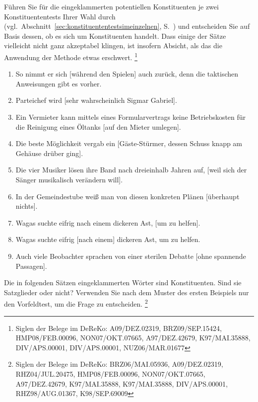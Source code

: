 



\Uebungen

\Uebung \label{u101} Führen Sie für die eingeklammerten potentiellen Konstituenten je zwei Konstituententests Ihrer Wahl durch (vgl.\ Abschnitt~\ref{sec:konstituententestsimeinzelnen}, S.~\pageref{sec:konstituententestsimeinzelnen}) und entscheiden Sie auf Basis dessen, ob es sich um Konstituenten handelt.
Dass einige der Sätze vielleicht nicht ganz akzeptabel klingen, ist insofern Absicht, als das die Anwendung der Methode etwas erschwert.%
\footnote{Siglen der Belege im DeReKo: A09\slash DEZ.02319, BRZ09\slash SEP.15424, HMP08\slash FEB.00096, NON07\slash OKT.07665, A97\slash DEZ.42679, K97\slash MAI.35888, DIV\slash APS.00001, DIV\slash APS.00001, NUZ06\slash MAR.01677}

\begin{enumerate}\Lf
  \item So nimmt er sich [während den Spielen] auch zurück, denn die taktischen Anweisungen gibt es vorher.
  \item Parteichef wird [sehr wahrscheinlich Sigmar Gabriel].
  \item Ein Vermieter kann mittels eines Formularvertrags keine Betriebskosten für die Reinigung eines Öltanks [auf den Mieter umlegen].
  \item Die beste Möglichkeit vergab ein [Gäste-Stürmer, dessen Schuss knapp am Gehäuse drüber ging].
  \item Die vier Musiker lösen ihre Band nach dreieinhalb Jahren auf, [weil sich der Sänger musikalisch verändern will].
  \item In der Gemeindestube weiß man von diesen konkreten Plänen [überhaupt nichts].
  \item Wagas suchte eifrig nach einem dickeren Ast, [um zu helfen].
  \item Wagas suchte eifrig [nach einem] dickeren Ast, um zu helfen.
  \item Auch viele Beobachter sprachen von einer sterilen Debatte [ohne spannende Passagen].
\end{enumerate}

\Uebung \label{u102} Die in folgenden Sätzen eingeklammerten Wörter sind Konstituenten.
Sind sie Satzglieder oder nicht?
Verwenden Sie nach dem Muster des ersten Beispiels nur den Vorfeldtest, um die Frage zu entscheiden.%
\footnote{Siglen der Belege im DeReKo: BRZ06\slash MAI.05936, A09\slash DEZ.02319, RHZ04\slash JUL.20475, HMP08\slash FEB.00096, NON07\slash OKT.07665, A97\slash DEZ.42679, K97\slash MAI.35888, K97\slash MAI.35888, DIV\slash APS.00001, RHZ98\slash AUG.01367, K98\slash SEP.69009}

